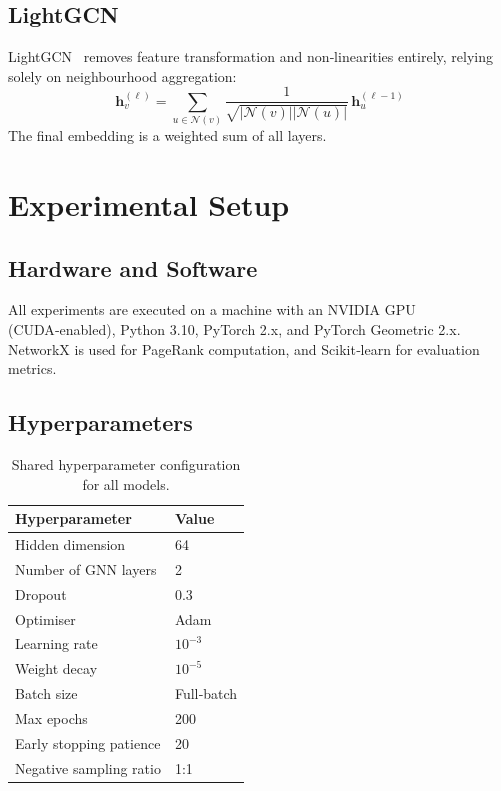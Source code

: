 \documentclass[conference]{IEEEtran}
\begin{document}
\subsection{LightGCN}
LightGCN~\cite{he2020} removes feature transformation and non‑linearities entirely, relying solely on neighbourhood aggregation:
\begin{equation}
\mathbf{h}_v^{(\ell)} = \sum_{u\in\mathcal{N}(v)} \frac{1}{\sqrt{|\mathcal{N}(v)||\mathcal{N}(u)|}}\,\mathbf{h}_u^{(\ell-1)}
\end{equation}
The final embedding is a weighted sum of all layers.

\section{Experimental Setup}\label{sec:setup}
\subsection{Hardware and Software}
All experiments are executed on a machine with an NVIDIA GPU (CUDA‑enabled), Python 3.10, PyTorch 2.x, and PyTorch Geometric 2.x. NetworkX is used for PageRank computation, and Scikit‑learn for evaluation metrics.

\subsection{Hyperparameters}
\begin{table}[!htbp]
\centering
\caption{Shared hyperparameter configuration for all models.}
\label{tab:hyperparams}
\begin{tabular}{ll}
\toprule
\textbf{Hyperparameter} & \textbf{Value} \\
\midrule
Hidden dimension      & 64 \\
Number of GNN layers  & 2  \\
Dropout               & 0.3 \\
Optimiser             & Adam \\
Learning rate         & $10^{-3}$ \\
Weight decay          & $10^{-5}$ \\
Batch size            & Full‑batch \\
Max epochs            & 200 \\
Early stopping patience & 20 \\
Negative sampling ratio & 1:1 \\
\bottomrule
\end{tabular}
\end{table}
\end{document}
